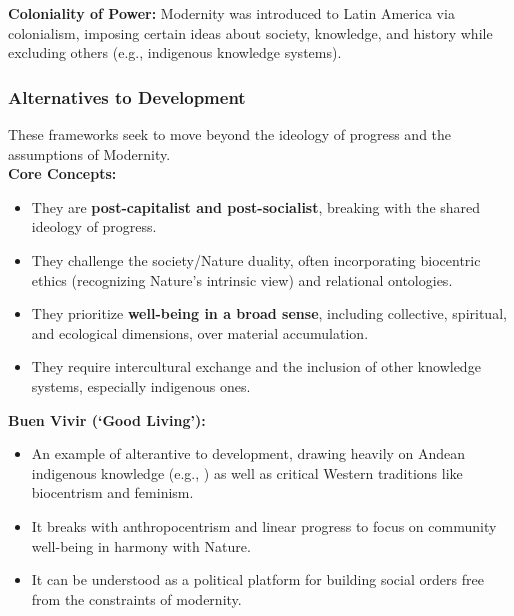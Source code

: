 \documentclass{article}
\begin{document}
    \noindent \textbf{Coloniality of Power:} Modernity was introduced to
Latin America via colonialism, imposing certain ideas about society,
knowledge, and history while excluding others (e.g., indigenous knowledge
systems).

    \subsubsection{Alternatives to Development}

    \noindent These frameworks seek to move beyond the ideology of progress
and the assumptions of Modernity.\\

    \noindent \textbf{Core Concepts:}
    \begin{itemize}
        \item They are \textbf{post-capitalist and post-socialist}, breaking
        with the shared ideology of progress.
        \item They challenge the society/Nature duality, often incorporating
        biocentric ethics (recognizing Nature's intrinsic view) and
        relational ontologies.
        \item They prioritize \textbf{well-being in a broad sense},
        including collective, spiritual, and ecological dimensions, over
        material accumulation.
        \item They require intercultural exchange and the inclusion of other
        knowledge systems, especially indigenous ones.
    \end{itemize}

    \noindent \textbf{Buen Vivir (`Good Living'):}
    \begin{itemize}
        \item An example of alterantive to development, drawing heavily on
        Andean indigenous knowledge (e.g., ) as well as critical Western traditions like biocentrism and feminism.
        \item It breaks with anthropocentrism and linear progress to focus
        on community well-being in harmony with Nature.
        \item It can be understood as a political platform for building
        social orders free from the constraints of modernity.
    \end{itemize}
\end{document}
